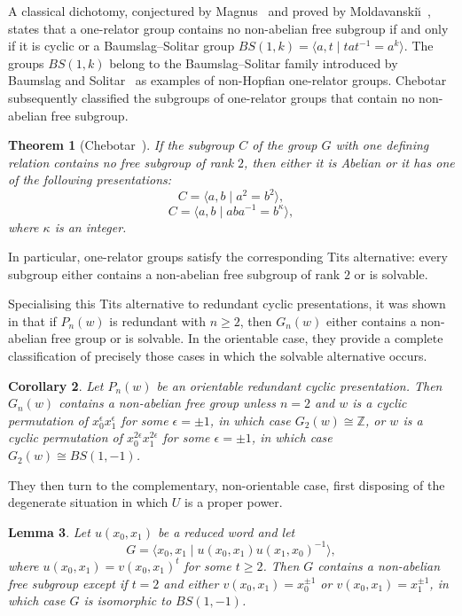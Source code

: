 \documentclass[a4paper,12pt,oneside]{article}
\newtheorem{theorem}{Theorem}
\newtheorem{lemma}[theorem]{Lemma}
\newtheorem{corollary}[theorem]{Corollary}
\theoremstyle{definition}
\begin{document}
\medskip
A classical dichotomy, conjectured by Magnus~\cite{Magnus1932} and proved by Moldavanski\u{\i}~\cite{Moldavanskii1969}, states that a one-relator group contains no non-abelian free subgroup if and only if it is cyclic or a Baumslag--Solitar group $
BS(1,k)=\langle a,t\mid tat^{-1}=a^k\rangle.$ The groups $BS(1,k)$ belong to the Baumslag--Solitar family introduced by Baumslag and Solitar~\cite{BaumslagSolitar1962} as examples of non-Hopfian one-relator groups. Chebotar~\cite{Chebotar1971} subsequently classified the subgroups of one-relator groups that contain no non-abelian free subgroup.


\begin{theorem}[Chebotar~\cite{Chebotar1971}]\label{thm:chebotar}
If the subgroup $C$ of the group $G$ with one defining relation
contains no free subgroup of rank $2$, then either it is Abelian or it
has one of the following presentations:
\[
C=\langle a,b\mid a^2=b^2\rangle,
\]
\[
C=\langle a,b\mid aba^{-1}=b^\kappa\rangle,
\]
where $\kappa$ is an integer.
\end{theorem}
In particular, one-relator groups satisfy the corresponding Tits alternative: every subgroup either contains a non-abelian free subgroup of rank $2$ or is solvable.

\medskip
Specialising this Tits alternative to redundant cyclic presentations,  it was shown in \cite{ChinyereWilliams2023} that if $P_n(w)$ is redundant with $n\geq 2$, then $G_n(w)$ either contains a non-abelian free group or is solvable. In the orientable case, they provide a complete classification of precisely those cases in which the solvable alternative occurs.

\begin{corollary}\cite[Corollary~4.3]{ChinyereWilliams2023}
Let $P_n(w)$ be an orientable redundant cyclic presentation. Then $G_n(w)$ contains a non-abelian free group unless $n=2$ and $w$ is a cyclic permutation of $x_0^\epsilon x_1^\epsilon$ for some $\epsilon=\pm1$, in which case $G_2(w)\cong\mathbb{Z}$, or $w$ is a cyclic permutation of $x_0^{2\epsilon}x_1^{2\epsilon}$ for some $\epsilon=\pm1$, in which case $G_2(w)\cong BS(1,-1)$.
\end{corollary}

They then turn to the complementary, non-orientable case, first disposing of the degenerate situation in which \(U\) is a proper power.

\begin{lemma}\cite[Lemma~4.4]{ChinyereWilliams2023}\label{lem:power}
 Let \(u(x_0,x_1)\) be a reduced word and let \[G=\langle x_0,x_1\mid u(x_0,x_1)u(x_1,x_0)^{-1}\rangle,\] where \(u(x_0,x_1)=v(x_0,x_1)^t\) for some \(t\geq2\). Then \(G\) contains a non-abelian free subgroup except if \(t=2\) and either \(v(x_0,x_1)=x_0^{\pm1}\) or \(v(x_0,x_1)=x_1^{\pm1}\), in which case \(G\) is isomorphic to \(BS(1,-1)\).

\end{lemma}
\end{document}
